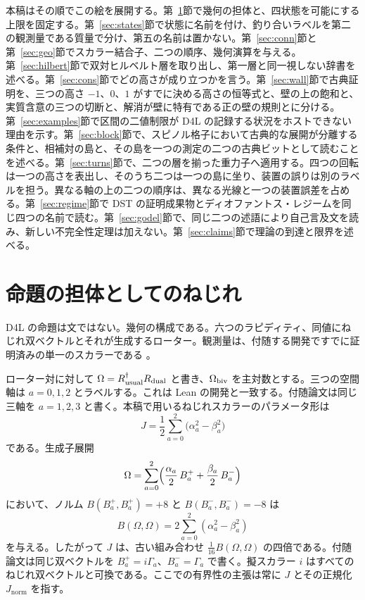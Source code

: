 \documentclass[a4paper]{article}
\theoremstyle{definition}
\newcommand{\Jnorm}{J_{\mathrm{norm}}}
\begin{document}
本稿はその順でこの絵を展開する。第~\ref{sec:torsion}節で幾何の担体と、四状態を可能にする上限を固定する。第~\ref{sec:states}節で状態に名前を付け、釣り合いラベルを第二の観測量である質量で分け、第五の名前は置かない。第~\ref{sec:conn}節と第~\ref{sec:geo}節でスカラー結合子、二つの順序、幾何演算を与える。第~\ref{sec:hilbert}節で双対ヒルベルト層を取り出し、第一層と同一視しない辞書を述べる。第~\ref{sec:cons}節でどの高さが成り立つかを言う。第~\ref{sec:wall}節で古典証明を、三つの高さ \(-1\)、\(0\)、\(1\) がすでに決める高さの恒等式と、壁の上の飽和と、実質含意の三つの切断と、解消が壁に特有である正の壁の規則とに分ける。第~\ref{sec:examples}節で区間の二値制限が D4L の記録する状況をホストできない理由を示す。第~\ref{sec:block}節で、スピノル格子において古典的な展開が分離する条件と、相補対の島と、その島を一つの測定の二つの古典ビットとして読むことを述べる。第~\ref{sec:turns}節で、二つの層を揃った重力子へ適用する。四つの回転は一つの高さを表出し、そのうち二つは一つの島に坐り、装置の誤りは別のラベルを担う。異なる軸の上の二つの順序は、異なる光線と一つの装置誤差を占める。第~\ref{sec:regime}節で DST の証明成果物とディオファントス・レジームを同じ四つの名前で読む。第~\ref{sec:godel}節で、同じ二つの述語により自己言及文を読み、新しい不完全性定理は加えない。第~\ref{sec:claims}節で理論の到達と限界を述べる。

\section{命題の担体としてのねじれ}
\label{sec:torsion}

D4L の命題は文ではない。幾何の構成である。六つのラピディティ、同値にねじれ双ベクトルとそれが生成するローター。観測量は、付随する開発ですでに証明済みの単一のスカラーである \cite{Diophantine2026}。

ローター対に対して \(\Omega=R_{\rm usual}^\dagger R_{\rm dual}\) と書き、\(\Omega_{\rm biv}\) を主対数とする。三つの空間軸は \(a=0,1,2\) とラベルする。これは Lean の開発と一致する。付随論文は同じ三軸を \(a=1,2,3\) と書く。本稿で用いるねじれスカラーのパラメータ形は
\begin{equation}
\label{eq:J-raw}
J = \frac12\sum_{a=0}^{2}\bigl(\alpha_a^2-\beta_a^2\bigr)
\end{equation}
である。生成子展開
\begin{equation}
\label{eq:omega-exp}
\Omega=\sum_{a=0}^{2}\Bigl(\frac{\alpha_a}{2}\,B^+_a
+\frac{\beta_a}{2}\,B^-_a\Bigr)
\end{equation}
において、ノルム \(B(B^+_a,B^+_a)=+8\) と \(B(B^-_a,B^-_a)=-8\) は
\begin{equation}
\label{eq:killing-omega}
B(\Omega,\Omega)=2\sum_{a=0}^{2}(\alpha_a^2-\beta_a^2)
\end{equation}
を与える。したがって \(J\) は、古い組み合わせ \(\frac1{16}B(\Omega,\Omega)\) の四倍である。付随論文は同じ双ベクトルを \(B^+_a=i\Gamma_a\)、\(B^-_a=\Gamma_a\) で書く。擬スカラー \(i\) はすべてのねじれ双ベクトルと可換である。ここでの有界性の主張は常に \(J\) とその正規化 \(\Jnorm\) を指す。
\end{document}
